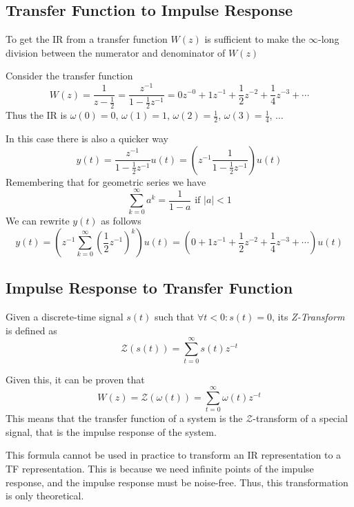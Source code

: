 \subsection{Transfer Function to Impulse Response}
To get the IR from a transfer function $W(z)$ is sufficient to make the $\infty$-long division between the numerator and denominator of $W(z)$
\begin{example}
    Consider the transfer function
    \[ W(z) = \frac{1}{z-\frac{1}{2}} = \frac{z^{-1}}{1-\frac{1}{2}z^{-1}}
        = 0 z^{-0} + 1 z^{-1} + \frac{1}{2}z^{-2} + \frac{1}{4}z^{-3} + \cdots \]
    Thus the IR is $\omega(0) = 0$, $\omega(1) = 1$, $\omega(2) = \frac{1}{2}$, $\omega(3) = \frac{1}{4}$, $\dots$

    In this case there is also a quicker way
    \[ y(t) = \frac{z^{-1}}{1-\frac{1}{2}z^{-1}} u(t) = \left( z^{-1} \frac{1}{1-\frac{1}{2}z^{-1}} \right) u(t) \]
    Remembering that for geometric series we have \[ \sum_{k = 0}^{\infty} a^k = \frac{1}{1-a} \text{ if } |a| < 1 \]
    We can rewrite $y(t)$ as follows
    \[ y(t) = \left( z^{-1} \sum_{k=0}^{\infty} \left( \frac{1}{2} z^{-1} \right)^{k} \right) u(t) = \left( 0 + 1 z^{-1} + \frac{1}{2}z^{-2} + \frac{1}{4}z^{-3} + \cdots \right) u(t) \]
\end{example}

\subsection{Impulse Response to Transfer Function}
\begin{definition}
    Given a discrete-time signal $s(t)$ such that $\forall t < 0: s(t) = 0$, its \emph{Z-Transform} is defined as
    \[ \mathcal{Z} \left( s(t) \right) = \sum_{t = 0}^{\infty} s(t) z^{-t} \]
\end{definition}
Given this, it can be proven that
\[ W(z) = \mathcal{Z}\left( \omega(t) \right) = \sum_{t = 0}^{\infty} \omega(t) z^{-t} \]
This means that the transfer function of a system is the $\mathcal{Z}$-transform of a special signal, that is the impulse response of the system.

\begin{remark}
    This formula cannot be used in practice to transform an IR representation to a TF representation.
    This is because we need infinite points of the impulse response, and the impulse response must be noise-free.
    Thus, this transformation is only theoretical.
\end{remark}

